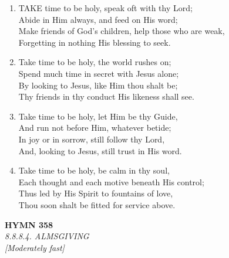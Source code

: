 \documentclass[11pt,a4paper]{article}
\begin{document}
\begin{enumerate}
    \item TAKE time to be holy, speak oft with thy Lord; \\
        Abide in Him always, and feed on His word; \\
        Make friends of God's children, help those who are weak, \\
        Forgetting in nothing His blessing to seek.

    \item Take time to be holy, the world rushes on; \\
        Spend much time in secret with Jesus alone; \\
        By looking to Jesus, like Him thou shalt be; \\
        Thy friends in thy conduct His likeness shall see.

    \item Take time to be holy, let Him be thy Guide, \\
        And run not before Him, whatever betide; \\
        In joy or in sorrow, still follow thy Lord, \\
        And, looking to Jesus, still trust in His word.

    \item Take time to be holy, be calm in thy soul, \\
        Each thought and each motive beneath His control; \\
        Thus led by His Spirit to fountains of love, \\
        Thou soon shalt be fitted for service above.

\end{enumerate}

\newpage
\begin{center}
    {\Large \textbf{HYMN 358}}
    \\
    \textit{8.8.8.4. ALMSGIVING}
    \\
    \textit{\small [Moderately fast]}
\end{center}
\vspace{1em}
\end{document}

